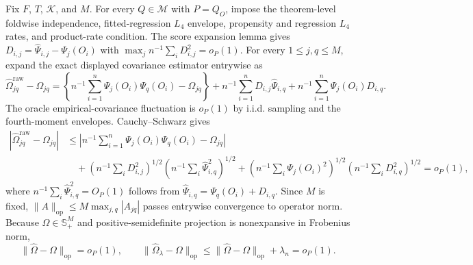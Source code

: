 Fix \(F\), \(T\), \(\mathcal K\), and \(M\). For every \(Q\in\mathcal M\) with \(P=Q_O\), impose the theorem-level foldwise independence, fitted-regression \(L_4\) envelope, propensity and regression \(L_4\) rates, and product-rate condition. The score expansion lemma gives \(D_{i,j}=\widehat\Psi_{i,j}-\Psi_j(O_i)\) with \(\max_j n^{-1}\sum_iD_{i,j}^2=o_P(1)\). For every \(1\le j,q\le M\), expand the exact displayed covariance estimator entrywise as \[\widehat\Omega^{\mathrm{raw}}_{jq}-\Omega_{jq}=\left\{n^{-1}\sum_{i=1}^n\Psi_j(O_i)\Psi_q(O_i)-\Omega_{jq}\right\}+n^{-1}\sum_{i=1}^nD_{i,j}\widehat\Psi_{i,q}+n^{-1}\sum_{i=1}^n\Psi_j(O_i)D_{i,q}.\] The oracle empirical-covariance fluctuation is \(o_P(1)\) by i.i.d. sampling and the fourth-moment envelopes. Cauchy--Schwarz gives \[\begin{aligned}|\widehat\Omega^{\mathrm{raw}}_{jq}-\Omega_{jq}|&\le\left|n^{-1}\sum_{i=1}^n\Psi_j(O_i)\Psi_q(O_i)-\Omega_{jq}\right|\\&\quad+\left(n^{-1}\sum_iD_{i,j}^2\right)^{1/2}\left(n^{-1}\sum_i\widehat\Psi_{i,q}^2\right)^{1/2}+\left(n^{-1}\sum_i\Psi_j(O_i)^2\right)^{1/2}\left(n^{-1}\sum_iD_{i,q}^2\right)^{1/2}=o_P(1),\end{aligned}\] where \(n^{-1}\sum_i\widehat\Psi_{i,q}^2=O_P(1)\) follows from \(\widehat\Psi_{i,q}=\Psi_q(O_i)+D_{i,q}\). Since \(M\) is fixed, \(\|A\|_{\mathrm{op}}\le M\max_{j,q}|A_{jq}|\) passes entrywise convergence to operator norm. Because \(\Omega\in\mathbb S_+^M\) and positive-semidefinite projection is nonexpansive in Frobenius norm, \[\|\widehat\Omega-\Omega\|_{\mathrm{op}}=o_P(1),\qquad \|\widehat\Omega_\lambda-\Omega\|_{\mathrm{op}}\le\|\widehat\Omega-\Omega\|_{\mathrm{op}}+\lambda_n=o_P(1).\]